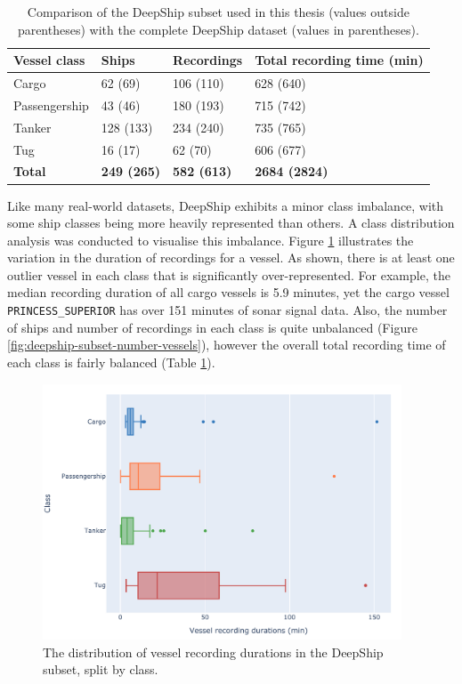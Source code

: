 \begin{table}[h]
\centering
\begin{tabular}{llll}
\toprule
\textbf{Vessel class} & \textbf{Ships} & \textbf{Recordings} & \textbf{Total recording time (min)} \\ \midrule
Cargo & 62 (69) & 106 (110) & 628 (640) \\
Passengership & 43 (46) & 180 (193) & 715 (742) \\
Tanker & 128 (133) & 234 (240) & 735 (765) \\
Tug & 16 (17) & 62 (70) & 606 (677) \\
\textbf{Total} & \textbf{249 (265)} & \textbf{582 (613)} & \textbf{2684 (2824)} \\ \bottomrule
\end{tabular}
\caption{Comparison of the DeepShip subset used in this thesis (values outside parentheses) with the complete DeepShip dataset (values in parentheses).}
\label{tab:deepship-subset}
\end{table}

Like many real-world datasets, DeepShip exhibits a minor class imbalance, with some ship classes being more heavily represented than others. A class distribution analysis was conducted to visualise this imbalance. Figure \ref{fig:deepship-subset-recording-length} illustrates the variation in the duration of recordings for a vessel. As shown, there is at least one outlier vessel in each class that is significantly over-represented. For example, the median recording duration of all cargo vessels is 5.9 minutes, yet the cargo vessel \texttt{PRINCESS\_SUPERIOR} has over 151 minutes of sonar signal data. Also, the number of ships and number of recordings in each class is quite unbalanced (Figure \ref{fig:deepship-subset-number-vessels}), however the overall total recording time of each class is fairly balanced (Table \ref{tab:deepship-subset}).

\begin{figure}[p]
    \centering
    \includegraphics[width=0.95\textwidth]{img/ch3/deepship_duration_spread.pdf}
    \caption{The distribution of vessel recording durations in the DeepShip subset, split by class.}
    \label{fig:deepship-subset-recording-length}
\end{figure}

